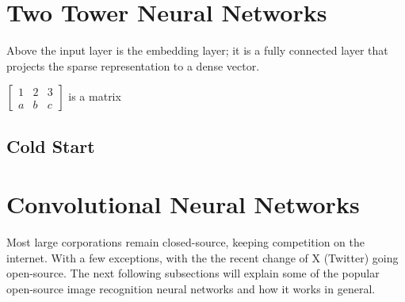 \section{Two Tower Neural Networks} \label{nn}

Above the input layer is the embedding layer; it is a fully
connected layer that projects the sparse representation to
a dense vector.  \cite{10.1145/3038912.3052569} \cite{DBLP:journals/corr/abs-1708-05027}    

$\begin{bmatrix}
1 & 2 & 3\\
a & b & c
\end{bmatrix} $ is a matrix

\subsection{Cold Start}\label{cold-start}

\begin{comment}
\noindent\rule{2cm}{0.4pt}

aTwo tower neural network architecture 
User embedding
Post embedding
embedding = vector
normalize vector
dot product of post and user vector
pre trained embeddings

\noindent\rule{2cm}{0.4pt}
\end{comment}

\section{Convolutional Neural Networks}\label{cnn}

Most large corporations remain closed-source, keeping competition on the internet. With a few exceptions, with the the recent change of X (Twitter) going open-source. The next following subsections will explain some of the popular open-source image recognition neural networks and how it works in general.


\begin{comment}







RAPID NET

\end{comment}